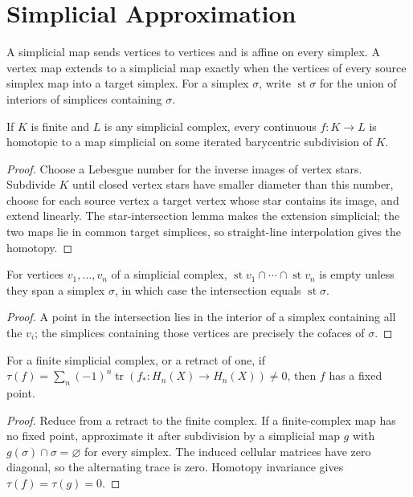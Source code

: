 \section{Simplicial Approximation}

A simplicial map sends vertices to vertices and is affine on every simplex.  A vertex map extends to a simplicial map exactly when the vertices of every source simplex map into a target simplex.  For a simplex $\sigma$, write $\operatorname{st}\sigma$ for the union of interiors of simplices containing $\sigma$.

\begin{theorem}
\label{thm:simplicial-approximation}

If $K$ is finite and $L$ is any simplicial complex, every continuous $f:K\to L$ is homotopic to a map simplicial on some iterated barycentric subdivision of $K$.
\end{theorem}
\begin{proof}
\sketch Choose a Lebesgue number for the inverse images of vertex stars.  Subdivide $K$ until closed vertex stars have smaller diameter than this number, choose for each source vertex a target vertex whose star contains its image, and extend linearly.  The star-intersection lemma makes the extension simplicial; the two maps lie in common target simplices, so straight-line interpolation gives the homotopy.
\end{proof}

\begin{lemma}
\label{lem:star-intersections}

For vertices $v_1,\ldots,v_n$ of a simplicial complex, $\operatorname{st}v_1\cap\cdots\cap\operatorname{st}v_n$ is empty unless they span a simplex $\sigma$, in which case the intersection equals $\operatorname{st}\sigma$.
\end{lemma}
\begin{proof}
\sketch A point in the intersection lies in the interior of a simplex containing all the $v_i$; the simplices containing those vertices are precisely the cofaces of $\sigma$.
\end{proof}

\begin{theorem}
\label{thm:lefschetz-fixed-point}

For a finite simplicial complex, or a retract of one, if $\tau(f)=\sum_n(-1)^n\operatorname{tr}(f_*:H_n(X)\to H_n(X))\ne0$, then $f$ has a fixed point.
\end{theorem}
\begin{proof}
\sketch Reduce from a retract to the finite complex.  If a finite-complex map has no fixed point, approximate it after subdivision by a simplicial map $g$ with $g(\sigma)\cap\sigma=\varnothing$ for every simplex.  The induced cellular matrices have zero diagonal, so the alternating trace is zero.  Homotopy invariance gives $\tau(f)=\tau(g)=0$.
\end{proof}

